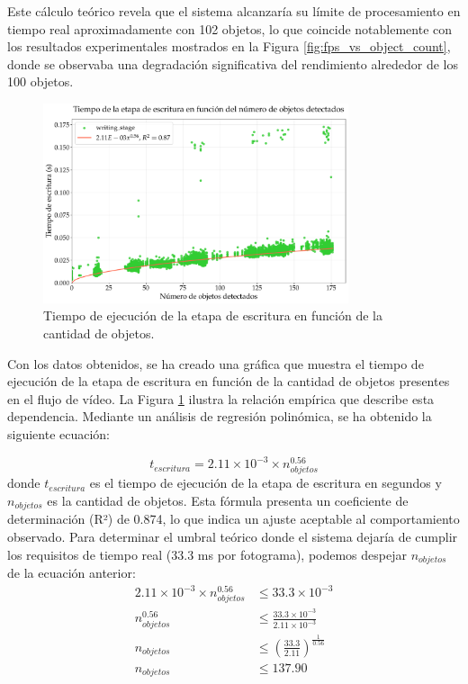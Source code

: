 \documentclass[11pt,spanish,listoffigures,listoftables]{tfgetsinf}
\begin{document}
Este cálculo teórico revela que el sistema alcanzaría su límite de procesamiento en tiempo real aproximadamente con 102 objetos, lo que coincide notablemente con los resultados experimentales mostrados en la Figura \ref{fig:fps_vs_object_count}, donde se observaba una degradación significativa del rendimiento alrededor de los 100 objetos.

\begin{figure}[H]
   \centering
   \includegraphics[width=0.8\textwidth]{excels/inferencia/cantidad_objetos/resultados/regresion_writing/regresion_writing.pdf}
   \caption[Tiempo de ejecución de la etapa de escritura en función de la cantidad de objetos]{Tiempo de ejecución de la etapa de escritura en función de la cantidad de objetos.}
   \label{fig:tiempo_etapa_escritura_cantidad_objetos}
\end{figure}

Con los datos obtenidos, se ha creado una gráfica que muestra el tiempo de ejecución de la etapa de escritura en función de la cantidad de objetos presentes en el flujo de vídeo. La Figura \ref{fig:tiempo_etapa_escritura_cantidad_objetos} ilustra la relación empírica que describe esta dependencia. Mediante un análisis de regresión polinómica, se ha obtenido la siguiente ecuación:

\begin{equation}
   t_{escritura} = 2.11 \times 10^{-3} \times n_{objetos}^{0.56}
\end{equation}
donde $t_{escritura}$ es el tiempo de ejecución de la etapa de escritura en segundos y $n_{objetos}$ es la cantidad de objetos. Esta fórmula presenta un coeficiente de determinación (R²) de 0.874, lo que indica un ajuste aceptable al comportamiento observado.
Para determinar el umbral teórico donde el sistema dejaría de cumplir los requisitos de tiempo real (33.3 ms por fotograma), podemos despejar $n_{objetos}$ de la ecuación anterior:
\begin{align}
   2.11 \times 10^{-3} \times n_{objetos}^{0.56} &\leq 33.3 \times 10^{-3} \\
   n_{objetos}^{0.56} &\leq \frac{33.3 \times 10^{-3}}{2.11 \times 10^{-3}} \\
   n_{objetos} &\leq \left(\frac{33.3}{2.11}\right)^{\frac{1}{0.56}} \\
   n_{objetos} &\leq 137.90
\end{align}
\end{document}
